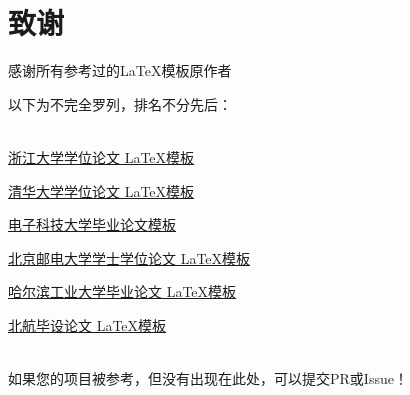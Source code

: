 
\chapter*{致谢}
感谢所有参考过的\LaTeX 模板原作者

以下为不完全罗列，排名不分先后：

~~\\

\href{https://www.github.com/TheNetAdmin/zjuthesis}{浙江大学学位论文 \LaTeX 模板}

\href{https://www.github.com/tuna/thuthesis}{清华大学学位论文 \LaTeX 模板}

\href{https://www.github.com/x-magus/ThesisUESTC}{电子科技大学毕业论文模板}

\href{https://www.github.com/sheng-qiang/BUPTBachelorThesis}{北京邮电大学学士学位论文 \LaTeX 模板}

\href{https://www.github.com/dustincys/hithesis}{哈尔滨工业大学毕业论文 \LaTeX 模板}

\href{https://www.github.com/BHOSC/BUAAthesis}{北航毕设论文 \LaTeX 模板}

~~\\

如果您的项目被参考，但没有出现在此处，可以提交PR或Issue！

\cleardoublepage
{}